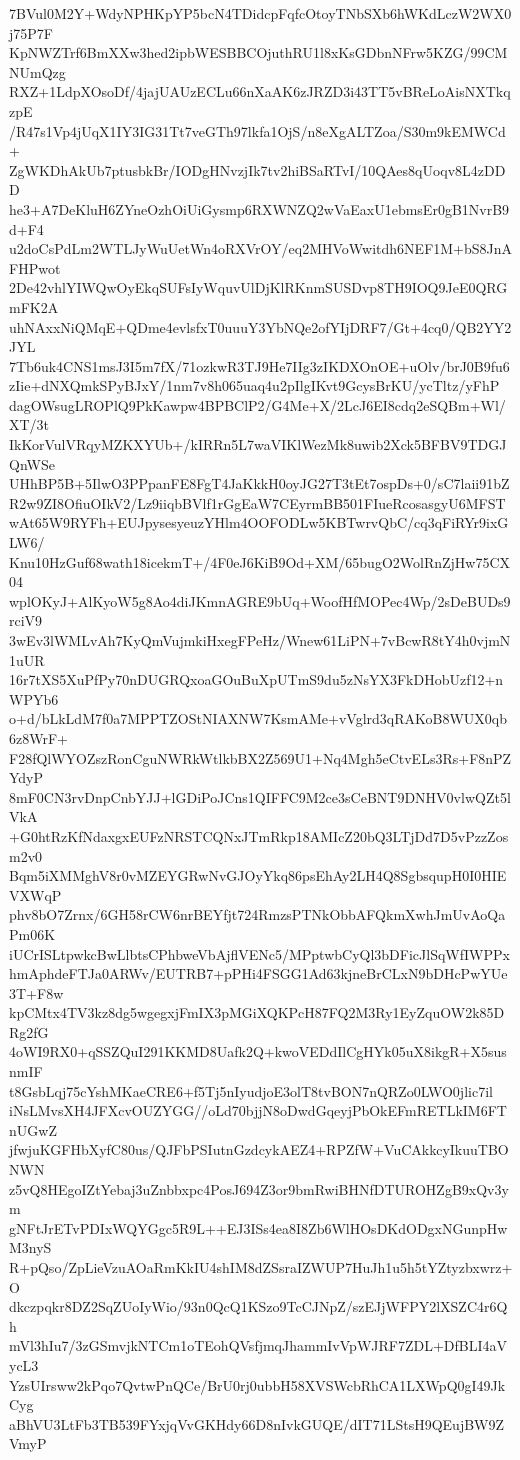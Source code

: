 7BVul0M2Y+WdyNPHKpYP5bcN4TDidcpFqfcOtoyTNbSXb6hWKdLczW2WX0j75P7F
KpNWZTrf6BmXXw3hed2ipbWESBBCOjuthRU1l8xKsGDbnNFrw5KZG/99CMNUmQzg
RXZ+1LdpXOsoDf/4jajUAUzECLu66nXaAK6zJRZD3i43TT5vBReLoAisNXTkqzpE
/R47s1Vp4jUqX1IY3IG31Tt7veGTh97lkfa1OjS/n8eXgALTZoa/S30m9kEMWCd+
ZgWKDhAkUb7ptusbkBr/IODgHNvzjIk7tv2hiBSaRTvI/10QAes8qUoqv8L4zDDD
he3+A7DeKluH6ZYneOzhOiUiGysmp6RXWNZQ2wVaEaxU1ebmsEr0gB1NvrB9d+F4
u2doCsPdLm2WTLJyWuUetWn4oRXVrOY/eq2MHVoWwitdh6NEF1M+bS8JnAFHPwot
2De42vhlYIWQwOyEkqSUFsIyWquvUlDjKlRKnmSUSDvp8TH9IOQ9JeE0QRGmFK2A
uhNAxxNiQMqE+QDme4evlsfxT0uuuY3YbNQe2ofYIjDRF7/Gt+4cq0/QB2YY2JYL
7Tb6uk4CNS1msJ3I5m7fX/71ozkwR3TJ9He7IIg3zIKDXOnOE+uOlv/brJ0B9fu6
zIie+dNXQmkSPyBJxY/1nm7v8h065uaq4u2pIlgIKvt9GcysBrKU/ycTltz/yFhP
dagOWsugLROPlQ9PkKawpw4BPBClP2/G4Me+X/2LcJ6EI8cdq2eSQBm+Wl/XT/3t
IkKorVulVRqyMZKXYUb+/kIRRn5L7waVIKlWezMk8uwib2Xck5BFBV9TDGJQnWSe
UHhBP5B+5IlwO3PPpanFE8FgT4JaKkkH0oyJG27T3tEt7ospDs+0/sC7laii91bZ
R2w9ZI8OfiuOIkV2/Lz9iiqbBVlf1rGgEaW7CEyrmBB501FIueRcosasgyU6MFST
wAt65W9RYFh+EUJpysesyeuzYHlm4OOFODLw5KBTwrvQbC/cq3qFiRYr9ixGLW6/
Knu10HzGuf68wath18icekmT+/4F0eJ6KiB9Od+XM/65bugO2WolRnZjHw75CX04
wplOKyJ+AlKyoW5g8Ao4diJKmnAGRE9bUq+WoofHfMOPec4Wp/2sDeBUDs9rciV9
3wEv3lWMLvAh7KyQmVujmkiHxegFPeHz/Wnew61LiPN+7vBcwR8tY4h0vjmN1uUR
16r7tXS5XuPfPy70nDUGRQxoaGOuBuXpUTmS9du5zNsYX3FkDHobUzf12+nWPYb6
o+d/bLkLdM7f0a7MPPTZOStNIAXNW7KsmAMe+vVglrd3qRAKoB8WUX0qb6z8WrF+
F28fQlWYOZszRonCguNWRkWtlkbBX2Z569U1+Nq4Mgh5eCtvELs3Rs+F8nPZYdyP
8mF0CN3rvDnpCnbYJJ+lGDiPoJCns1QIFFC9M2ce3sCeBNT9DNHV0vlwQZt5lVkA
+G0htRzKfNdaxgxEUFzNRSTCQNxJTmRkp18AMIcZ20bQ3LTjDd7D5vPzzZosm2v0
Bqm5iXMMghV8r0vMZEYGRwNvGJOyYkq86psEhAy2LH4Q8SgbsqupH0I0HIEVXWqP
phv8bO7Zrnx/6GH58rCW6nrBEYfjt724RmzsPTNkObbAFQkmXwhJmUvAoQaPm06K
iUCrISLtpwkcBwLlbtsCPhbweVbAjflVENc5/MPptwbCyQl3bDFicJlSqWfIWPPx
hmAphdeFTJa0ARWv/EUTRB7+pPHi4FSGG1Ad63kjneBrCLxN9bDHcPwYUe3T+F8w
kpCMtx4TV3kz8dg5wgegxjFmIX3pMGiXQKPcH87FQ2M3Ry1EyZquOW2k85DRg2fG
4oWI9RX0+qSSZQuI291KKMD8Uafk2Q+kwoVEDdIlCgHYk05uX8ikgR+X5susnmIF
t8GsbLqj75cYshMKaeCRE6+f5Tj5nIyudjoE3olT8tvBON7nQRZo0LWO0jlic7il
iNsLMvsXH4JFXcvOUZYGG//oLd70bjjN8oDwdGqeyjPbOkEFmRETLkIM6FTnUGwZ
jfwjuKGFHbXyfC80us/QJFbPSIutnGzdcykAEZ4+RPZfW+VuCAkkcyIkuuTBONWN
z5vQ8HEgoIZtYebaj3uZnbbxpc4PosJ694Z3or9bmRwiBHNfDTUROHZgB9xQv3ym
gNFtJrETvPDIxWQYGgc5R9L++EJ3ISs4ea8I8Zb6WlHOsDKdODgxNGunpHwM3nyS
R+pQso/ZpLieVzuAOaRmKkIU4shIM8dZSsraIZWUP7HuJh1u5h5tYZtyzbxwrz+O
dkczpqkr8DZ2SqZUoIyWio/93n0QcQ1KSzo9TcCJNpZ/szEJjWFPY2lXSZC4r6Qh
mVl3hIu7/3zGSmvjkNTCm1oTEohQVsfjmqJhammIvVpWJRF7ZDL+DfBLI4aVycL3
YzsUIrsww2kPqo7QvtwPnQCe/BrU0rj0ubbH58XVSWcbRhCA1LXWpQ0gI49JkCyg
aBhVU3LtFb3TB539FYxjqVvGKHdy66D8nIvkGUQE/dIT71LStsH9QEujBW9ZVmyP
